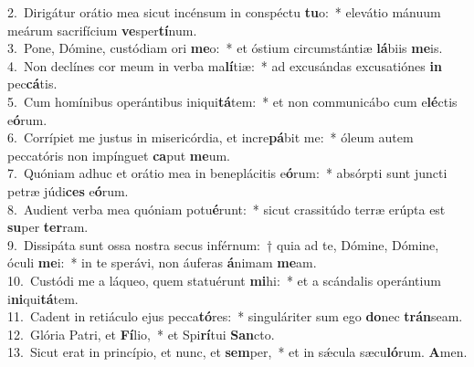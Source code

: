 {2.~}Dirigátur orátio mea sicut incénsum in conspéctu \textbf{tu}o:~* elevátio mánuum meárum sacrifícium \textbf{ve}sper\textbf{tí}num.\\
{3.~}Pone, Dómine, custódiam ori \textbf{me}o:~* et óstium circumstántiæ \textbf{lá}biis \textbf{me}is.\\
{4.~}Non declínes cor meum in verba ma\textbf{lí}tiæ:~* ad excusándas excusatiónes \textbf{in} pec\textbf{cá}tis.\\
{5.~}Cum homínibus operántibus iniqui\textbf{tá}tem:~* et non communicábo cum e\textbf{lé}ctis e\textbf{ó}rum.\\
{6.~}Corrípiet me justus in misericórdia, et incre\textbf{pá}bit me:~* óleum autem peccatóris non impínguet \textbf{ca}put \textbf{me}um.\\
{7.~}Quóniam adhuc et orátio mea in beneplácitis e\textbf{ó}rum:~* absórpti sunt juncti petræ júdi\textbf{ces} e\textbf{ó}rum.\\
{8.~}Audient verba mea quóniam potu\textbf{é}runt:~* sicut crassitúdo terræ erúpta est \textbf{su}per \textbf{ter}ram.\\
{9.~}Dissipáta sunt ossa nostra secus inférnum:~† quia ad te, Dómine, Dómine, óculi \textbf{me}i:~* in te sperávi, non áuferas \textbf{á}nimam \textbf{me}am.\\
{10.~}Custódi me a láqueo, quem statuérunt \textbf{mi}hi:~* et a scándalis operántium i\textbf{ni}qui\textbf{tá}tem.\\
{11.~}Cadent in retiáculo ejus pecca\textbf{tó}res:~* singuláriter sum ego \textbf{do}nec \textbf{trán}seam.\\
{12.~}Glória Patri, et \textbf{Fí}lio,~* et Spi\textbf{rí}tui \textbf{San}cto.\\
{13.~}Sicut erat in princípio, et nunc, et \textbf{sem}per,~* et in sǽcula sæcu\textbf{ló}rum. \textbf{A}men.\\
